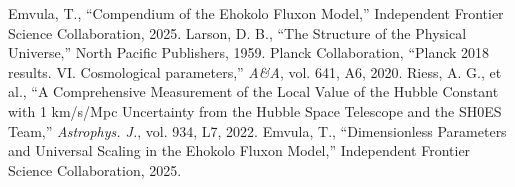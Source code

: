 \documentclass[11pt]{article}
\begin{document}

\begin{thebibliography}{9}
\raggedright
{} Emvula, T., ``Compendium of the Ehokolo Fluxon Model,'' Independent Frontier Science Collaboration, 2025.
 Larson, D. B., ``The Structure of the Physical Universe,'' North Pacific Publishers, 1959.
 Planck Collaboration, ``Planck 2018 results. VI. Cosmological parameters,'' \textit{A\&A}, vol. 641, A6, 2020.
 Riess, A. G., et al., ``A Comprehensive Measurement of the Local Value of the Hubble Constant with 1 km/s/Mpc Uncertainty from the Hubble Space Telescope and the SH0ES Team,'' \textit{Astrophys. J.}, vol. 934, L7, 2022.
 Emvula, T., ``Dimensionless Parameters and Universal Scaling in the Ehokolo Fluxon Model,'' Independent Frontier Science Collaboration, 2025.
\end{thebibliography}
\end{document}
